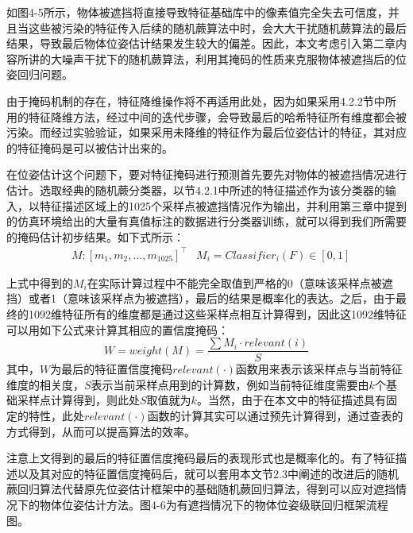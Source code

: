 如图4-5所示，物体被遮挡将直接导致特征基础库中的像素值完全失去可信度，并且当这些被污染的特征传入后续的随机蕨算法中时，会大大干扰随机蕨算法的最后结果，导致最后物体位姿估计结果发生较大的偏差。因此，本文考虑引入第二章内容所讲的大噪声干扰下的随机蕨算法，利用其掩码的性质来克服物体被遮挡后的位姿回归问题。

由于掩码机制的存在，特征降维操作将不再适用此处，因为如果采用4.2.2节中所用的特征降维方法，经过中间的迭代步骤，会导致最后的哈希特征所有维度都会被污染。而经过实验验证，如果采用未降维的特征作为最后位姿估计的特征，其对应的特征掩码是可以被估计出来的。

在位姿估计这个问题下，要对特征掩码进行预测首先要先对物体的被遮挡情况进行估计。选取经典的随机蕨分类器，以节4.2.1中所述的特征描述作为该分类器的输入，以特征描述区域上的1025个采样点被遮挡情况作为输出，并利用第三章中提到的仿真环境给出的大量有真值标注的数据进行分类器训练，就可以得到我们所需要的掩码估计初步结果。如下式所示：
\begin{equation}
\begin{aligned}
	& M: \left[m_1,m_2,...,m_1025\right]^\top
	& M_i=Classifier_i(F)\in[0,1]
\end{aligned}
\end{equation}

上式中得到的$M_i$在实际计算过程中不能完全取值到严格的0（意味该采样点被遮挡）或者1（意味该采样点为被遮挡），最后的结果是概率化的表达。之后，由于最终的1092维特征所有的维度都是通过这些采样点相互计算得到，因此这1092维特征可以用如下公式来计算其相应的置信度掩码：
\begin{equation}
	W=weight(M)=\frac{\sum M_i\cdot relevant(i)}{S}
\end{equation}
其中，$W$为最后的特征置信度掩码$relevant(\cdot)$函数用来表示该采样点与当前特征维度的相关度，$S$表示当前采样点用到的计算数，例如当前特征维度需要由$k$个基础采样点计算得到，则此处$S$取值就为$k$。当然，由于在本文中的特征描述具有固定的特性，此处$relevant(\cdot)$函数的计算其实可以通过预先计算得到，通过查表的方式得到，从而可以提高算法的效率。

注意上文得到的最后的特征置信度掩码最后的表现形式也是概率化的。有了特征描述以及其对应的特征置信度掩码后，就可以套用本文节2.3中阐述的改进后的随机蕨回归算法代替原先位姿估计框架中的基础随机蕨回归算法，得到可以应对遮挡情况下的物体位姿估计方法。图4-6为有遮挡情况下的物体位姿级联回归框架流程图。

